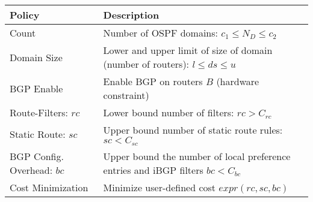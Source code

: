 \begin{table}[!t]
\begin{small}
	\begin{center}
		\begin{tabular}{m{6.5em}  m{17.7em} } 
			{\bf Policy} & {\bf Description} \\ 
			\hline
			Count  & Number of OSPF domains: $c_1\leq N_D\leq c_2$  \\ \hline
			Domain Size  & Lower and upper
			limit of size of domain (number of routers): $l\leq ds\leq u$ \\ \hline
			BGP \newline Enable & Enable BGP on routers $B$ (hardware constraint) \\ \hline
			Route-Filters: $rc$ & Lower bound number of filters:
			$rc > C_{rc}$\\ \hline
			Static Route: ${sc}$ & Upper bound number of static route rules: $sc < C_{sc}$ \\ \hline
			BGP Config. Overhead: $bc$ & Upper bound the number of local preference entries and iBGP filters $bc < C_{bc}$ \\ \hline
			Cost Minimization & Minimize user-defined cost $expr(rc, sc, bc)$
		\end{tabular}
	\end{center}
	 \label{tab:configpolicysupport} 
\end{small}
\end{table}
